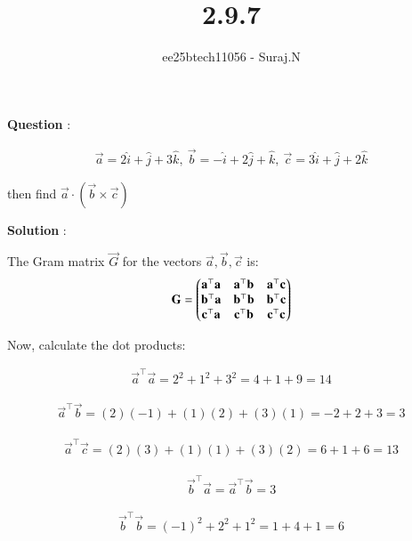 \documentclass[journal,12pt,onecolumn]{IEEEtran}
\theoremstyle{remark}
\begin{document}
\title{2.9.7}
\author{ee25btech11056 - Suraj.N}
\maketitle
\renewcommand{\thefigure}{\theenumi}
\renewcommand{\thetable}{\theenumi}

\textbf{Question} :  

\begin{align*}
\vec{a}=2\hat{i}+\hat{j}+3\hat{k},\ \vec{b}=-\hat{i}+2\hat{j}+\hat{k},\ \vec{c}=3\hat{i}+\hat{j}+2\hat{k}
\end{align*}

\begin{center}
then find \(\vec{a}\cdot(\vec{b}\times\vec{c})\)
\end{center}

\begin{table}[h!]
  \centering
  
  \caption*{Table : vectors}
  \label{2.9.7}
\end{table}

\textbf{Solution} :

The Gram matrix \( \vec{G} \) for the vectors \( \vec{a}, \vec{b}, \vec{c} \) is:
\begin{align}
\vec{G} = \myvec{
\vec{a}^\top \vec{a} & \vec{a}^\top \vec{b} & \vec{a}^\top \vec{c} \\
\vec{b}^\top \vec{a} & \vec{b}^\top \vec{b} & \vec{b}^\top \vec{c} \\
\vec{c}^\top \vec{a} & \vec{c}^\top \vec{b} & \vec{c}^\top \vec{c}
}
\end{align}

Now, calculate the dot products:

\begin{align}
\vec{a}^\top \vec{a} = 2^2 + 1^2 + 3^2 = 4 + 1 + 9 = 14
\end{align}

\begin{align}
\vec{a}^\top \vec{b} = (2)(-1) + (1)(2) + (3)(1) = -2 + 2 + 3 = 3
\end{align}

\begin{align}
\vec{a}^\top \vec{c} = (2)(3) + (1)(1) + (3)(2) = 6 + 1 + 6 = 13
\end{align}

\begin{align}
\vec{b}^\top \vec{a} = \vec{a}^\top \vec{b} = 3
\end{align}

\begin{align}
\vec{b}^\top \vec{b} = (-1)^2 + 2^2 + 1^2 = 1 + 4 + 1 = 6
\end{align}
\end{document}
